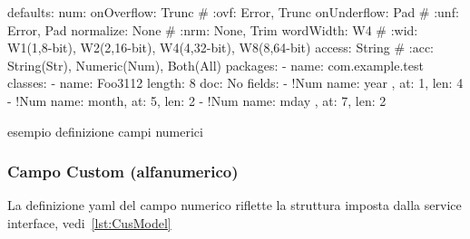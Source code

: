 \documentclass[a4paper,10pt]{report}
\newif\ifesource
\newenvironment{elisting}[1][!htb]
  {\captionsetup{aboveskip=0pt}\begin{listing}[#1]}
  {\end{listing}%
}
\begin{document}
\ifesource
\begin{figure*}[!htb]
\begin{lstlisting}[language=yaml, caption={esempio definizione campi numerici}, 
label=lst:xmplNum]
defaults:
  num:
    onOverflow: Trunc   # :ovf: Error, Trunc
    onUnderflow: Pad    # :unf: Error, Pad
    normalize: None     # :nrm: None, Trim
    wordWidth: W4       # :wid: W1(1,8-bit), W2(2,16-bit), W4(4,32-bit), W8(8,64-bit)
    access: String      # :acc: String(Str), Numeric(Num), Both(All)
packages:
  - name: com.example.test
    classes:
      - name: Foo3112
        length: 8
        doc: No
        fields:
          - !Num { name: year , at: 1, len: 4 }
          - !Num { name: month, at: 5, len: 2 }
          - !Num { name: mday , at: 7, len: 2 }
\end{lstlisting}
\end{figure*}
\else
\begin{elisting}
\begin{yamlcode}
defaults:
  num:
    onOverflow: Trunc   # :ovf: Error, Trunc
    onUnderflow: Pad    # :unf: Error, Pad
    normalize: None     # :nrm: None, Trim
    wordWidth: W4       # :wid: W1(1,8-bit), W2(2,16-bit), W4(4,32-bit), W8(8,64-bit)
    access: String      # :acc: String(Str), Numeric(Num), Both(All)
packages:
  - name: com.example.test
    classes:
      - name: Foo3112
        length: 8
        doc: No
        fields:
          - !Num { name: year , at: 1, len: 4 }
          - !Num { name: month, at: 5, len: 2 }
          - !Num { name: mday , at: 7, len: 2 }
\end{yamlcode}
\caption{esempio definizione campi numerici}
\label{lst:xmplNum}
\end{elisting}
\fi


\subsubsection{Campo Custom (alfanumerico)} \label{sub:yaml.cus}
La definizione yaml del campo numerico riflette la struttura imposta dalla
service interface, vedi~\ref{lst:CusModel}
\end{document}
